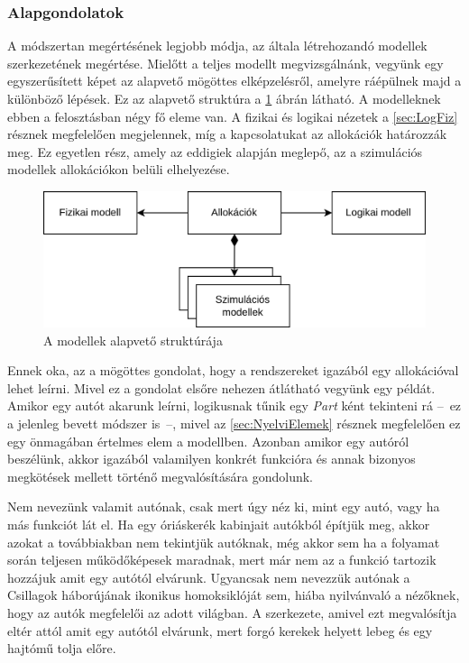         \subsubsection{Alapgondolatok} \label{sec:Alapgondolatok}
        A módszertan megértésének legjobb módja, az általa létrehozandó modellek szerkezetének megértése. Mielőtt a teljes modellt megvizsgálnánk, vegyünk egy egyszerűsített képet az alapvető mögöttes elképzelésről, amelyre ráépülnek majd a különböző lépések. Ez az alapvető struktúra a \ref{fig:Alapstruktura} ábrán látható.
        A modelleknek ebben a felosztásban négy fő eleme van. A fizikai és logikai nézetek a \ref{sec:LogFiz} résznek megfelelően megjelennek, míg a kapcsolatukat az allokációk határozzák meg.
        Ez egyetlen rész, amely az eddigiek alapján meglepő, az a szimulációs modellek allokációkon belüli elhelyezése.
        \begin{figure}[!ht]
            \centering
            \includegraphics[width=150mm, keepaspectratio]{figures/Alapelemek.drawio.png}
            \caption{A modellek alapvető struktúrája} 
            \label{fig:Alapstruktura}
        \end{figure}

        Ennek oka, az a mögöttes gondolat, hogy a rendszereket igazából egy allokációval lehet leírni. Mivel ez a gondolat elsőre nehezen átlátható vegyünk egy példát.
        Amikor egy autót akarunk leírni, logikusnak tűnik egy \emph{Part} ként tekinteni rá --~ez a jelenleg bevett módszer is~--, mivel az \ref{sec:NyelviElemek} résznek megfelelően ez egy önmagában értelmes elem a modellben.
        Azonban amikor egy autóról beszélünk, akkor igazából valamilyen konkrét funkcióra és annak bizonyos megkötések mellett történő megvalósítására gondolunk.
        
        Nem nevezünk valamit autónak, csak mert úgy néz ki, mint egy autó, vagy ha más funkciót lát el. Ha egy óriáskerék kabinjait autókból építjük meg, akkor azokat a továbbiakban nem tekintjük autóknak, még akkor sem ha a folyamat során teljesen működőképesek maradnak, mert már nem az a funkció tartozik hozzájuk amit egy autótól elvárunk.
        Ugyancsak nem nevezzük autónak a Csillagok háborújának ikonikus homoksiklóját sem, hiába nyilvánvaló a nézőknek, hogy az autók megfelelői az adott világban. A szerkezete, amivel ezt megvalósítja eltér attól amit egy autótól elvárunk, mert forgó kerekek helyett lebeg és egy hajtómű tolja előre.

